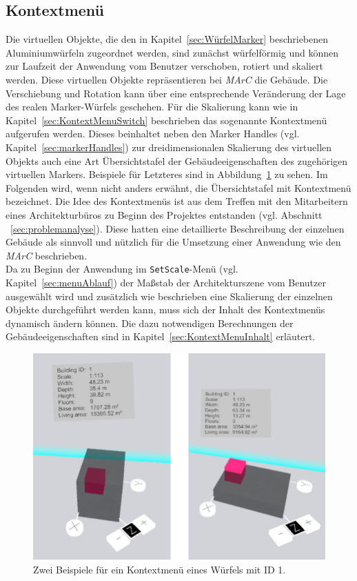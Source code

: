 \subsection{Kontextmenü}\label{sec:kontextMenu}
Die virtuellen Objekte, die den in Kapitel~\ref{sec:WürfelMarker} beschriebenen Aluminiumwürfeln zugeordnet werden, sind zunächst würfelförmig und können zur Laufzeit der Anwendung vom Benutzer verschoben, rotiert und skaliert werden. Diese virtuellen Objekte repräsentieren bei \emph{MArC} die Gebäude. Die Verschiebung und Rotation kann über eine entsprechende Veränderung der Lage des realen Marker-Würfels geschehen. Für die Skalierung kann wie in Kapitel~\ref{sec:KontextMenuSwitch} beschrieben das sogenannte Kontextmenü aufgerufen werden. Dieses beinhaltet neben den Marker Handles (vgl. Kapitel~\ref{sec:markerHandles}) zur dreidimensionalen Skalierung des virtuellen Objekts auch eine Art Übersichtstafel der Gebäudeeigenschaften des zugehörigen virtuellen Markers. Beispiele für Letzteres sind in Abbildung~\ref{fig:KontextmenuExamples} zu sehen. Im Folgenden wird, wenn nicht anders erwähnt, die Übersichtstafel mit \glqq Kontextmenü\grqq{} bezeichnet. Die Idee des Kontextmenüs ist aus dem Treffen mit den Mitarbeitern eines Architekturbüros zu Beginn des Projektes entstanden (vgl. Abschnitt ~\ref{sec:problemanalyse}). Diese hatten eine detaillierte Beschreibung der einzelnen Gebäude als sinnvoll und nützlich für die Umsetzung einer Anwendung wie den \textit{MArC} beschrieben.\\
Da zu Beginn der Anwendung im \texttt{SetScale}-Menü (vgl. Kapitel~\ref{sec:menuAblauf}) der Maßstab der Architekturszene vom Benutzer ausgewählt wird und zusätzlich wie beschrieben eine Skalierung der einzelnen Objekte durchgeführt werden kann, muss sich der Inhalt des Kontextmenüs dynamisch ändern können. Die dazu notwendigen Berechnungen der Gebäudeeigenschaften sind in Kapitel~\ref{sec:KontextMenuInhalt} erläutert. 

\begin{figure}[H]
	\centering
	\includegraphics[scale=.3]{Bilder/Eigene Fotos/KontextMenue.jpg}
	\caption{Zwei Beispiele für ein Kontextmenü eines Würfels mit ID 1.}
	\label{fig:KontextmenuExamples}
\end{figure}

